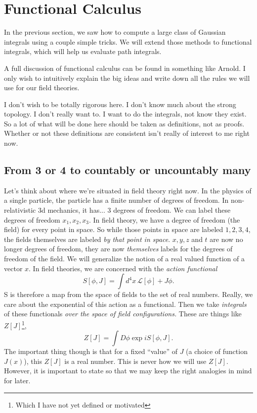 \documentclass{book}
\begin{document}
\chapter{Functional Calculus}
In the previous section, we saw how to compute a large class of Gaussian integrals using a couple simple tricks. We will extend those methods to functional integrals, which will help us evaluate path integrals.

A full discussion of functional calculus can be found in something like Arnold. I only wish to intuitively explain the big ideas and write down all the rules we will use for our field theories.

I don't wish to be totally rigorous here. I don't know much about the strong topology. I don't really want to. I want to do the integrals, not know they exist. So a lot of what will be done here should be taken as definitions, not as proofs. Whether or not these definitions are consistent isn't really of interest to me right now.

\section{From 3 or 4 to countably or uncountably many}
Let's think about where we're situated in field theory right now. In the physics of a single particle, the particle has a finite number of degrees of freedom. In non-relativistic 3d mechanics, it has... 3 degrees of freedom. We can label these degrees of freedom $x_1,x_2,x_3$. In field theory, we have a degree of freedom (the field) for every point in space. So while those points in space are labeled $1,2,3,4$, the fields themselves are labeled \textit{by that point in space}. $x,y,z$ and $t$ are now no longer degrees of freedom, they are now \textit{themselves} labels for the degrees of freedom of the field. 
We will generalize the notion of a real valued function of a vector $x$. In field theories, we are concerned with the \textit{action functional}
\[
S[\phi,J] = \int d^4 x \, \mathcal{L} [\phi] + J \phi.
\]
S is therefore a map from the space of fields to the set of real numbers. Really, we care about the exponential of this action as a functional. Then we take \textit{integrals} of these functionals \textit{over the space of field configurations.} These are things like $Z[J]$\footnote{Which I have not yet defined or motivated},
\[
Z[J] = \int D \phi \exp{i S[\phi,J]}.
\]
The important thing though is that for a fixed ``value'' of $J$ (a choice of function $J(x)$), this $Z[J]$ is a real number. This is never how we will use $Z[J]$. However, it is important to state so that we may keep the right analogies in mind for later. 
\newpage
\end{document}
